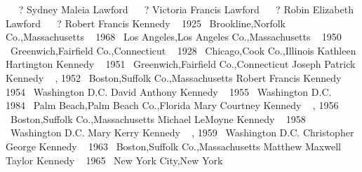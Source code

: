 {{ \btag\ {} {\placefont \at\ }{\placefont  ? }
\endsubtree 
{}%
{\descfont Sydney Maleia Lawford}
 \btag\ {} {\placefont \at\ }{\placefont  ? }
\endsubtree 
{}%
{\descfont Victoria Francis Lawford}
 \btag\ {} {\placefont \at\ }{\placefont  ? }
\endsubtree 
{}%
{\descfont Robin Elizabeth Lawford}
 \btag\ {} {\placefont \at\ }{\placefont  ? }
\endsubtree 
\endsubtree 
{}%
{\descfont Robert Francis Kennedy}
\sepline 
{} \btag\ { \nov{} 1925} {\placefont \at\ }{\placefont Brookline,Norfolk Co.,Massachusetts}
 \dtag\ { \jun{} 1968} {\placefont \at\ }{\placefont Los Angeles,Los Angeles Co.,Massachusetts}
 \mtag\ { \jun{} 1950} {\placefont \at\ }{\placefont Greenwich,Fairfield Co.,Connecticut}
 \btag\ { \apr{} 1928} {\placefont \at\ }{\placefont Chicago,Cook Co.,Illinois}
% 
{\descfont Kathleen Hartington Kennedy}
 \btag\ { \jul{} 1951} {\placefont \at\ }{\placefont Greenwich,Fairfield Co.,Connecticut}
\endsubtree 
{}%
{\descfont Joseph Patrick Kennedy}
 \btag\ { \sep{} 1952} {\placefont \at\ }{\placefont Boston,Suffolk Co.,Massachusetts}
\endsubtree 
{}%
{\descfont Robert Francis Kennedy}
 \btag\ { \jan{} 1954} {\placefont \at\ }{\placefont Washington D.C.}
\endsubtree 
{}%
{\descfont David Anthony Kennedy}
 \btag\ { \jun{} 1955} {\placefont \at\ }{\placefont Washington D.C.}
 \dtag\ { \apr{} 1984} {\placefont \at\ }{\placefont Palm Beach,Palm Beach Co.,Florida}
\endsubtree 
{}%
{\descfont Mary Courtney Kennedy}
 \btag\ { \sep{} 1956} {\placefont \at\ }{\placefont Boston,Suffolk Co.,Massachusetts}
\endsubtree 
{}%
{\descfont Michael LeMoyne Kennedy}
 \btag\ { \feb{} 1958} {\placefont \at\ }{\placefont Washington D.C.}
\endsubtree 
{}%
{\descfont Mary Kerry Kennedy}
 \btag\ { \sep{} 1959} {\placefont \at\ }{\placefont Washington D.C.}
\endsubtree 
{}%
{\descfont Christopher George Kennedy}
 \btag\ { \jul{} 1963} {\placefont \at\ }{\placefont Boston,Suffolk Co.,Massachusetts}
\endsubtree 
{}%
{\descfont Matthew Maxwell Taylor Kennedy}
 \btag\ { \jan{} 1965} {\placefont \at\ }{\placefont New York City,New York}
}}
